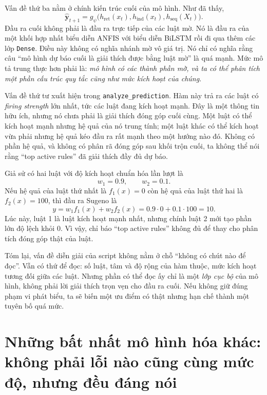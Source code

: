 Vấn đề thứ ba nằm ở chính kiến trúc cuối của mô hình. Như đã thấy,
\[
\widehat{\mathbf y}_{t+1}
=
g_\psi\bigl(
h_{\mathrm{ret}}(x_t),
h_{\mathrm{ind}}(x_t),
h_{\mathrm{seq}}(X_t)
\bigr).
\]
Đầu ra cuối không phải là đầu ra trực tiếp của các luật mờ. Nó là đầu ra của một khối hợp nhất biểu diễn ANFIS với biểu diễn BiLSTM rồi đi qua thêm các lớp \texttt{Dense}. Điều này không có nghĩa nhánh mờ vô giá trị. Nó chỉ có nghĩa rằng câu ``mô hình dự báo cuối là giải thích được bằng luật mờ'' là quá mạnh. Mức mô tả trung thực hơn phải là: \emph{mô hình có các thành phần mờ, và ta có thể phân tích một phần cấu trúc quy tắc cũng như mức kích hoạt của chúng}.

Vấn đề thứ tư xuất hiện trong \texttt{analyze\_prediction}. Hàm này trả ra các luật có \emph{firing strength} lớn nhất, tức các luật đang kích hoạt mạnh. Đây là một thông tin hữu ích, nhưng nó chưa phải là giải thích đóng góp cuối cùng. Một luật có thể kích hoạt mạnh nhưng hệ quả của nó trung tính; một luật khác có thể kích hoạt vừa phải nhưng hệ quả kéo đầu ra rất mạnh theo một hướng nào đó. Không có phần hệ quả, và không có phân rã đóng góp sau khối trộn cuối, ta không thể nói rằng ``top active rules'' đã giải thích đầy đủ dự báo.

\begin{example}
Giả sử có hai luật với độ kích hoạt chuẩn hóa lần lượt là
\[
w_1=0.9,\qquad w_2=0.1.
\]
Nếu hệ quả của luật thứ nhất là \(f_1(x)=0\) còn hệ quả của luật thứ hai là \(f_2(x)=100\), thì đầu ra Sugeno là
\[
y = w_1 f_1(x) + w_2 f_2(x) = 0.9\cdot 0 + 0.1\cdot 100 = 10.
\]
Lúc này, luật 1 là luật kích hoạt mạnh nhất, nhưng chính luật 2 mới tạo phần lớn độ lệch khỏi 0. Vì vậy, chỉ báo ``top active rules'' không đủ để thay cho phân tích đóng góp thật của luật.
\end{example}

Tóm lại, vấn đề diễn giải của script không nằm ở chỗ ``không có chút nào để đọc''. Vẫn có thứ để đọc: số luật, tâm và độ rộng của hàm thuộc, mức kích hoạt tương đối giữa các luật. Nhưng phần có thể đọc ấy chỉ là một \emph{lớp cục bộ} của mô hình, không phải lời giải thích trọn vẹn cho đầu ra cuối. Nếu không giữ đúng phạm vi phát biểu, ta sẽ biến một ưu điểm có thật nhưng hạn chế thành một tuyên bố quá mức.

\section{Những bất nhất mô hình hóa khác: không phải lỗi nào cũng cùng mức độ, nhưng đều đáng nói}

